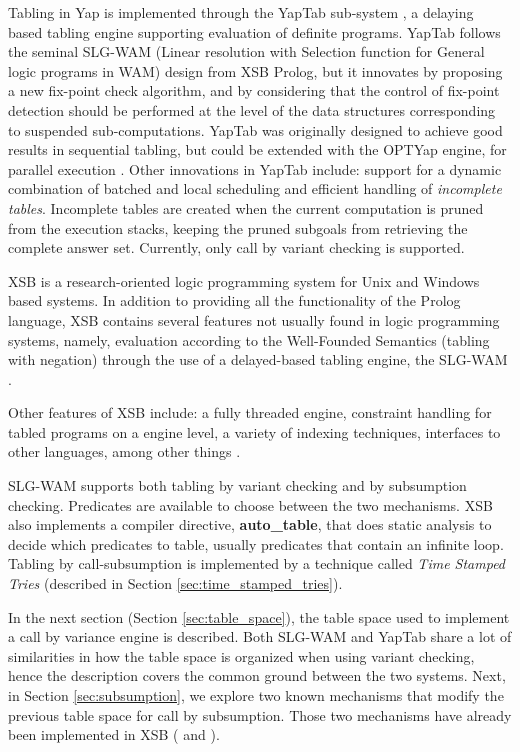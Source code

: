   Tabling in Yap is implemented through the YapTab sub-system \cite{Rocha-03c}, a delaying based tabling engine supporting evaluation of
  definite programs. YapTab follows the seminal SLG-WAM (Linear resolution with Selection function for General logic programs in WAM)
  design from XSB Prolog,
  but it innovates by proposing a new fix-point check algorithm, and by considering that the control of fix-point detection should be
  performed at the level of the data structures corresponding to suspended sub-computations. YapTab was originally designed to achieve
  good results in sequential tabling, but could be extended with the OPTYap engine, for parallel execution \cite{Rocha-05a}.
  Other innovations in YapTab include: support for a dynamic combination of batched and local scheduling and efficient handling of \textit{incomplete
  tables}. Incomplete tables are created when the current computation is pruned from the execution stacks, keeping the pruned subgoals from retrieving
  the complete answer set. Currently, only call by variant checking is supported.
  
  XSB is a research-oriented logic programming system for Unix and Windows based systems. In addition to providing all the functionality
  of the Prolog language, XSB contains several features not usually found in logic programming systems, namely, evaluation according to the
  Well-Founded Semantics (tabling with negation) \cite{Gelder-91} through the use of a delayed-based tabling engine, the SLG-WAM \cite{Chen-96}.
  
  Other features of XSB include: a fully threaded engine, constraint handling for tabled programs on a engine level, a variety of indexing
  techniques, interfaces to other languages, among other things \cite{system-xsb}.
  
  SLG-WAM supports both tabling by variant checking and by subsumption checking. Predicates are available to choose between the two mechanisms.
  XSB also implements a compiler directive, \textbf{auto\_table}, that does static analysis to decide which predicates to table, usually predicates that contain an infinite loop. Tabling by call-subsumption is implemented by a technique called \textit{Time Stamped Tries} \cite{Johnson-99} (described in Section \ref{sec:time_stamped_tries}).
  
  In the next section (Section \ref{sec:table_space}), the table space used to implement
  a call by variance engine is described. Both SLG-WAM and YapTab
  share a lot of similarities in how the table space is organized when using variant checking, hence the description covers
  the common ground between the two systems. Next, in Section \ref{sec:subsumption}, we explore two known mechanisms that
  modify the previous table space for call by subsumption. Those two mechanisms have already been implemented in XSB (\cite{Rao-96} and \cite{Johnson-99}).
  

